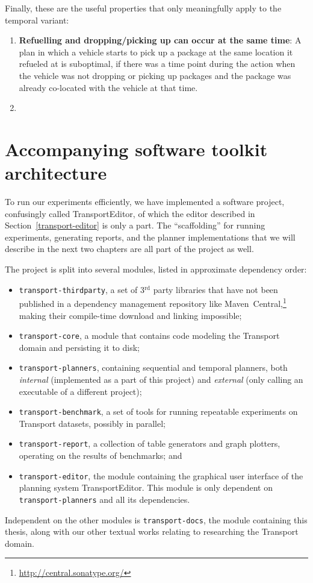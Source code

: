 Finally, these are the useful properties that only meaningfully apply to the temporal variant:
\begin{enumerate}
\item \textbf{Refuelling and dropping/picking up can occur at the same time}: 
A plan in which a vehicle starts to pick up a package at the same location it refueled at is suboptimal, if there was a time point during the  action
when the vehicle was not dropping or picking up packages and the package was already
co-located with the vehicle at that time.

\item \textbf{}
\end{enumerate}












\section{Accompanying software toolkit architecture}

To run our experiments efficiently, we have implemented a software project,
confusingly called TransportEditor, of which the editor described in
Section~\ref{transport-editor} is only a part.
The ``scaffolding'' for running experiments, generating reports, and the planner implementations that we will describe in the next two chapters are all part
of the project as well.

The project is split into several modules, listed in approximate dependency order:
\begin{itemize}
\item \texttt{transport-thirdparty}, a set of 3$^\textrm{rd}$ party libraries
that have not been published in a dependency management repository like Maven~Central,\footnote{\url{http://central.sonatype.org/}}
making their compile-time download and linking impossible;
\item \texttt{transport-core}, a module that contains code modeling the Transport
domain and persisting it to disk;
\item \texttt{transport-planners}, containing sequential and temporal planners, both \textit{internal} (implemented as a part of this project) and \textit{external}
(only calling an executable of a different project);
\item \texttt{transport-benchmark}, a set of tools for running repeatable
experiments on Transport datasets, possibly in parallel;
\item \texttt{transport-report}, a collection of table generators and graph plotters,
operating on the results of benchmarks; and
\item \texttt{transport-editor}, the module containing the graphical user interface
of the planning system TransportEditor. This module is only dependent
on \texttt{transport-planners} and all its dependencies.
\end{itemize}
Independent on the other modules is \texttt{transport-docs},
the module containing this thesis,
along with our other textual works relating to researching the Transport domain.

